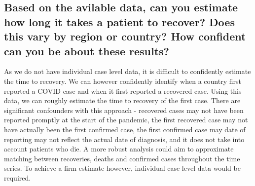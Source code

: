 \documentclass[8pt]{article}
\begin{document}
\subsection{Based on the avilable data, can you estimate how long it takes a patient to recover? Does this vary by region or country? How confident can you be about these results?}As we do not have individual case level data, it is difficult to confidently estimate the time to recovery. We can however confidently identify when a country first reported a COVID case and when it first reported a recovered case. Using this data, we can roughly estimate the time to recovery of the first case. There are significant confounders with this approach - recovered cases may not have been reported promptly at the start of the pandemic, the first recovered case may not have actually been the first confirmed case, the first confirmed case may date of reporting may not reflect the actual date of diagnosis, and it does not take into account patients who die. A more robust analysis could aim to approximate matching between recoveries, deaths and confirmed cases throughout the time series. To achieve a firm estimate however, individual case level data would be required.
\end{document}

